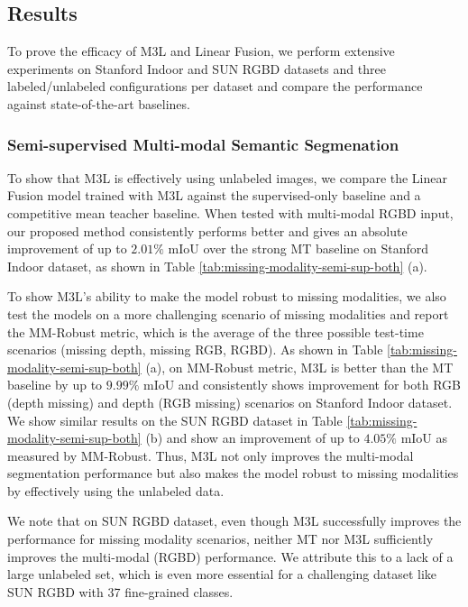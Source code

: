 \documentclass[10pt,twocolumn,letterpaper]{article}
\begin{document}
\subsection{Results}

To prove the efficacy of M3L and Linear Fusion, we perform extensive experiments on Stanford Indoor and SUN RGBD datasets and three labeled/unlabeled configurations per dataset and compare the performance against state-of-the-art baselines. \vspace{-0.5cm}
\subsubsection{Semi-supervised Multi-modal Semantic Segmenation}
\label{sec:results-missing-mod-semi-sup}

To show that M3L is effectively using unlabeled images, we compare the Linear Fusion model trained with M3L against the supervised-only baseline and a competitive mean teacher \cite{mt} baseline. When tested with multi-modal RGBD input, our proposed method consistently performs better and gives an absolute improvement of up to $2.01\%$ mIoU over the strong MT \cite{mt} baseline on Stanford Indoor \cite{stanfordindoor} dataset, as shown in Table \ref{tab:missing-modality-semi-sup-both} (a).



To show M3L’s ability to make the model robust to missing modalities, we also test the models on a more challenging scenario of missing modalities and report the MM-Robust metric, which is the average of the three possible test-time scenarios (missing depth, missing RGB, RGBD). As shown in Table \ref{tab:missing-modality-semi-sup-both} (a), on MM-Robust metric, M3L is better than the MT baseline by up to $9.99\%$ mIoU and consistently shows improvement for both RGB (depth missing) and depth (RGB missing) scenarios on Stanford Indoor dataset. We show similar results on the SUN RGBD dataset in Table \ref{tab:missing-modality-semi-sup-both} (b) and show an improvement of up to $4.05\%$ mIoU as measured by MM-Robust. Thus, M3L not only improves the multi-modal segmentation performance but also makes the model robust to missing modalities by effectively using the unlabeled data.

We note that on SUN RGBD dataset, even though M3L successfully improves the performance for missing modality scenarios, neither MT \cite{mt} nor M3L sufficiently improves the multi-modal (RGBD) performance. We attribute this to a lack of a large unlabeled set, which is even more essential for a challenging dataset like SUN RGBD with 37 fine-grained classes. 
\end{document}

